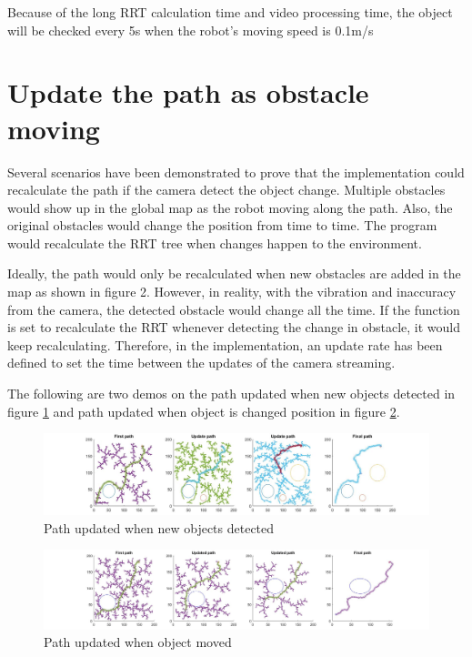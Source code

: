 \documentclass[
  oneside]{ubcthesis}
\begin{document}
Because of the long RRT calculation time and video processing time, the object will be checked every 5s when the robot's moving speed is 0.1m/s

\hypertarget{update-the-path-as-obstacle-moving}{%
\section{Update the path as obstacle moving}\label{update-the-path-as-obstacle-moving}}

Several scenarios have been demonstrated to prove that the implementation could recalculate the path if the camera detect the object change. Multiple obstacles would show up in the global map as the robot moving along the path. Also, the original obstacles would change the position from time to time. The program would recalculate the RRT tree when changes happen to the environment.

Ideally, the path would only be recalculated when new obstacles are added in the map as shown in figure 2. However, in reality, with the vibration and inaccuracy from the camera, the detected obstacle would change all the time. If the function is set to recalculate the RRT whenever detecting the change in obstacle, it would keep recalculating. Therefore, in the implementation, an update rate has been defined to set the time between the updates of the camera streaming.

The following are two demos on the path updated when new objects detected in figure \ref{fig:figure10} and path updated when object is changed position in figure \ref{fig:figure11}.

\begin{figure}

{\centering \includegraphics[width=0.9\linewidth]{figures/10} 

}

\caption{Path updated when new objects detected}\label{fig:figure10}
\end{figure}



\begin{figure}

{\centering \includegraphics[width=0.9\linewidth]{figures/11} 

}

\caption{Path updated when object moved}\label{fig:figure11}
\end{figure}
\end{document}
